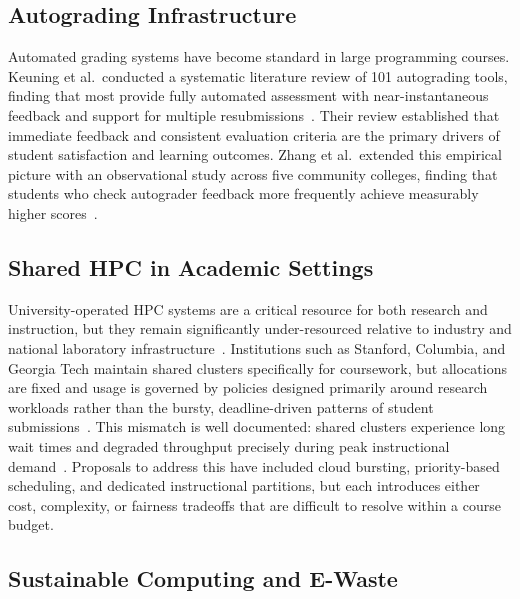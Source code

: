\documentclass[acmlarge]{acmart}
\begin{document}
\subsection{Autograding Infrastructure}
 
Automated grading systems have become standard in large programming
courses. Keuning et al.\ conducted a systematic literature review of
101 autograding tools, finding that most provide fully automated
assessment with near-instantaneous feedback and support for multiple
resubmissions~\cite{keuning2018}. Their review established that
immediate feedback and consistent evaluation criteria are the primary
drivers of student satisfaction and learning outcomes. Zhang et al.\
extended this empirical picture with an observational study across five
community colleges, finding that students who check autograder feedback
more frequently achieve measurably higher scores~\cite{tran2025}.
 
\subsection{Shared HPC in Academic Settings}
 
University-operated HPC systems are a critical resource for both
research and instruction, but they remain significantly
under-resourced relative to industry and national laboratory
infrastructure~\cite{hpcsurvey2025}. Institutions such as Stanford,
Columbia, and Georgia Tech maintain shared clusters specifically for
coursework, but allocations are fixed and usage is governed by
policies designed primarily around research workloads rather than the
bursty, deadline-driven patterns of student
submissions~\cite{hpcsurvey2025}. This mismatch is well documented: shared
clusters experience long wait times and degraded throughput precisely
during peak instructional demand~\cite{hpcsurvey2025}. Proposals to
address this have included cloud bursting, priority-based scheduling,
and dedicated instructional partitions, but each introduces either
cost, complexity, or fairness tradeoffs that are difficult to resolve
within a course budget.
 
\subsection{Sustainable Computing and E-Waste}
 
\end{document}
